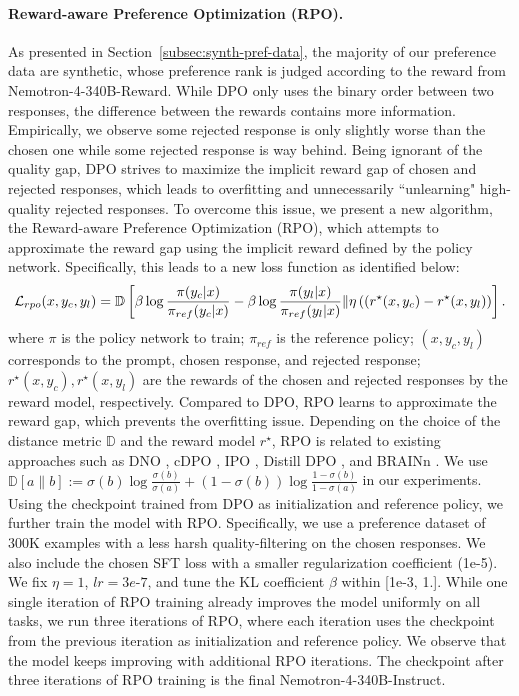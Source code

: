 \documentclass[11pt]{article}
\newcommand{\oursin}{Nemotron-4-340B-Instruct}
\newcommand{\oursrm}{Nemotron-4-340B-Reward}
\begin{document}
\paragraph{Reward-aware Preference Optimization (RPO).} As presented in Section~\ref{subsec:synth-pref-data}, the majority of our preference data are synthetic, whose preference rank is judged according to the reward from \oursrm{}. While DPO only uses the binary order between two responses, the difference between the rewards contains more information. Empirically, we observe some rejected response is only slightly worse than the chosen one while some rejected response is way behind. Being ignorant of the quality gap, DPO strives to maximize the implicit reward gap of chosen and rejected responses, which leads to overfitting and unnecessarily ``unlearning" high-quality rejected responses. To overcome this issue, we present a new algorithm, the Reward-aware Preference Optimization (RPO), which attempts to approximate the reward gap using the implicit reward defined by the policy network. Specifically, this leads to a new loss function as identified below:
\begin{align}
    \mathcal{L}_{rpo}(x, y_c, y_l) = \mathbb{D}\left[ \beta \log\frac{\pi (y_c| x)}{\pi_{ref} (y_c|x)}  - \beta \log\frac{\pi (y_l| x)}{\pi_{ref} (y_l|x)}  \| \eta \left((r^\star(x, y_c) - r^\star(x, y_l) \right) \right]. \notag
\end{align}
where $\pi$ is the policy network to train; $\pi_{ref}$ is the reference policy; $(x, y_c, y_l)$ corresponds to the prompt, chosen response, and rejected response; $r^\star(x, y_c), r^\star(x, y_l)$ are the rewards of the chosen and rejected responses by the reward model, respectively. 
Compared to DPO, RPO learns to approximate the reward gap, which prevents the overfitting issue. Depending on the choice of the distance metric $\mathbb{D}$ and the reward model $r^\star$, RPO is related to existing approaches such as DNO \citep{rosset2024direct}, cDPO \citep{mitchell2023note},  IPO \citep{azar2024general}, Distill DPO \citep{fisch2024robust}, and BRAINn \citep{pandey2024brain}. We use $\mathbb{D}\left[a\|b\right] := \sigma(b) \log \frac{\sigma(b)}{\sigma(a)} + (1-\sigma(b)) \log \frac{1-\sigma(b)}{1-\sigma(a)}$ in our experiments.
Using the checkpoint trained from DPO as initialization and reference policy, we further train the model with RPO. Specifically, we use a preference dataset of 300K examples with a less harsh quality-filtering on the chosen responses. We also include the chosen SFT loss with a smaller regularization coefficient (1e-5). We fix $\eta=1$, $lr=3e\text{-}7$, and tune the KL coefficient $\beta$ within [1e-3, 1.]. While one single iteration of RPO training already improves the model uniformly on all tasks, we run three iterations of RPO, where each iteration uses the checkpoint from the previous iteration as initialization and reference policy. We observe that the model keeps improving with additional RPO iterations. The checkpoint after three iterations of RPO training is the final \oursin.
\end{document}
